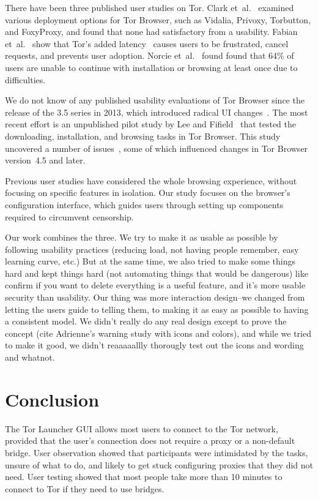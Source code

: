 \documentclass[USenglish,oneside,twocolumn]{article}
\begin{document}
{\color {red} 
There have been three published user studies on Tor. Clark et~al.~\cite{clark2007usability} examined various deployment
options for Tor Browser, such as Vidalia, Privoxy, Torbutton, and FoxyProxy, and found that none had satisfactory from a usability. Fabian et~al.~\cite{fabian2010privately} show that Tor's added
latency~\cite{dingledine2009performance} causes users
to be frustrated, cancel requests, and prevents user adoption. 
Norcie et~al.~\cite{norcie2012eliminating} found found that 
64\% of users are unable to continue with installation or browsing at least once due to difficulties.

We do not know of any published usability evaluations of
Tor Browser since the release of the 3.5 series in 2013, which introduced radical UI changes~\cite{torbrowser-35}.
The most recent effort is an unpublished pilot study by Lee and Fifield~\cite{uxsprint} 
that tested the downloading, installation, and browsing tasks in Tor Browser.  This study uncovered a number of issues~\cite{uxsprint2015-tickets},
some of which influenced changes in Tor Browser version~4.5 and later.

Previous user studies have considered the whole browsing experience,
without focusing on specific features in isolation.
Our study focuses on 
the browser's configuration interface, which guides users through setting up components required to circumvent censorship. 

Our work combines the three. We try to make it as usable as possible by following usability practices (reducing load, not having people remember, easy learning curve, etc.) But at the same time, we also tried to make some things hard and kept things hard (not automating things that would be dangerous) like confirm if you want to delete everything is a useful feature, and it's more usable security than usability. Our thing was more interaction design--we changed from letting the users guide to telling them, to making it as easy as possible to having a consistent model. We didn't really do any real design except to prove the concept (cite Adrienne's warning study with icons and colors), and while we tried to make it good, we didn't reaaaaallly thorougly test out the icons and wording and whatnot. 
}

\section{Conclusion} 
\label{sec:conclusion}
The Tor Launcher GUI allows most users to connect to the Tor network, provided that the user's connection does not require a proxy or a non-default bridge. User observation showed that participants were intimidated by the tasks, unsure of what to do, and likely to get stuck configuring proxies that they did not need. User testing showed that most people take more than 10 minutes to connect to Tor if they need to use bridges. 
\end{document}

